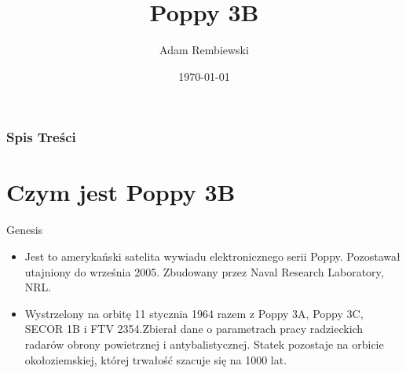 \documentclass{beamer}
\title{Poppy 3B}
\author{Adam Rembiewski}
\institute{UWM}
\date{\today}
\begin{document}
\frame{\titlepage}



\begin{frame}
\frametitle{Spis Treści}
\tableofcontents
\end{frame}



\section{Czym jest Poppy 3B}
\begin{frame}{Genesis}
\begin{itemize}
\item{Jest to amerykański satelita wywiadu elektronicznego serii Poppy. Pozostawał utajniony do września 2005. Zbudowany przez Naval Research Laboratory, NRL.}
\pause
\item{Wystrzelony na orbitę 11 stycznia 1964 razem z Poppy 3A, Poppy 3C, SECOR 1B i FTV 2354.Zbierał dane o parametrach pracy radzieckich radarów obrony powietrznej i antybalistycznej. Statek pozostaje na orbicie okołoziemskiej, której trwałość szacuje się na 1000 lat.}
\end{itemize}
\end{frame}
\end{document}
